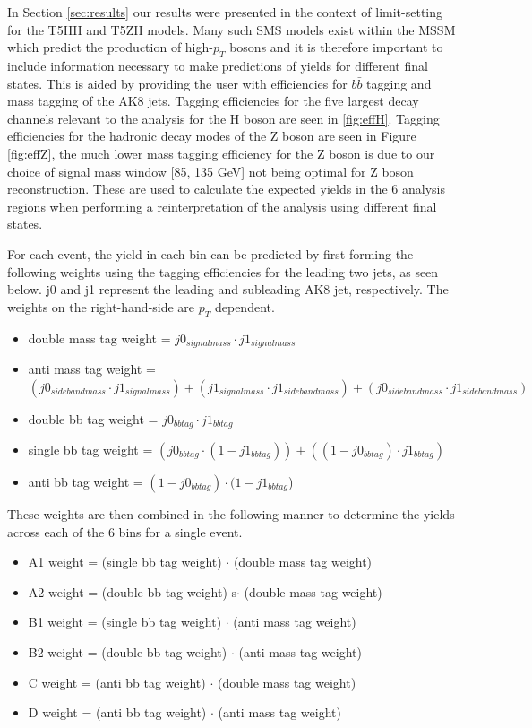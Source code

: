 In Section \ref{sec:results} our results were presented in the context of limit-setting for the T5HH and T5ZH models. Many such SMS models exist within the MSSM which predict the production of high-$p_{T}$ bosons and it is therefore important to include information necessary to make predictions of yields for different final states. This is aided by providing the user with efficiencies for $b\bar{b}$ tagging and mass tagging of the AK8 jets. Tagging efficiencies for the five largest decay channels relevant to the analysis for the H boson are seen in \ref{fig:effH}. Tagging efficiencies for the hadronic decay modes of the Z boson are seen in Figure \ref{fig:effZ}, the much lower mass tagging efficiency for the Z boson is due to our choice of signal mass window [85, 135 GeV] not being optimal for Z boson reconstruction. These are used to calculate the expected yields in the 6 analysis regions when performing a reinterpretation of the analysis using different final states. 

For each event, the yield in each bin can be predicted by first forming the following weights using the tagging efficiencies for the leading two jets, as seen below. j0 and j1 represent the leading and subleading AK8 jet, respectively. The weights on the right-hand-side are $p_{T}$ dependent.

\begin{itemize}
\item double mass tag weight = $j0_{signalmass} \cdot j1_{signalmass}$
\item anti mass tag weight = $(j0_{sidebandmass} \cdot j1_{signalmass}) + (j1_{signalmass} \cdot j1_{sidebandmass}) + (j0_{sidebandmass} \cdot j1_{sidebandmass})$
\item double bb tag weight = $j0_{bbtag} \cdot j1_{bbtag}$
\item single bb tag weight = $(j0_{bbtag} \cdot (1-j1_{bbtag})) + ((1-j0_{bbtag})\cdot j1_{bbtag})$
\item anti bb tag weight = $(1-j0_{bbtag}) \cdot (1-j1_{bbtag}$)
\end{itemize}

These weights are then combined in the following manner to determine the yields across each of the 6 bins for a single event.

\begin{itemize}
\item A1 weight = (single bb tag weight) $\cdot$ (double mass tag weight)
\item A2 weight = (double bb tag weight) s$\cdot$ (double mass tag weight)
\item B1 weight = (single bb tag weight) $\cdot$ (anti mass tag weight)
\item B2 weight = (double bb tag weight) $\cdot$ (anti mass tag weight)
\item C weight = (anti bb tag weight) $\cdot$ (double mass tag weight)
\item D weight = (anti bb tag weight) $\cdot$ (anti mass tag weight)
\end{itemize}

